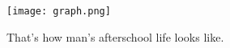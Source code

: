 \documentclass[margin=5mm]{standalone}
\begin{document}
    \texttt{[image: graph.png]}
    
    That's how man's afterschool life looks like.
\end{document}

